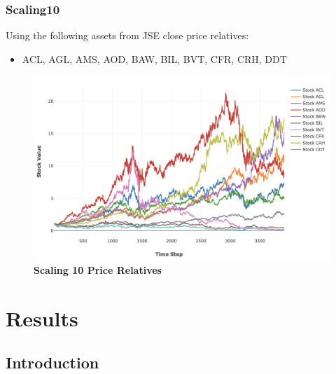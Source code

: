 \documentclass[a4paper,11pt,oneside]{article}
\theoremstyle{plain}
\theoremstyle{definition}
\begin{document}
\subsubsection{Scaling10}\label{dataset_scaling10}

Using the following assets from JSE close price relatives:

\begin{itemize}
	\item ACL, AGL, AMS, AOD, BAW, BIL, BVT, CFR, CRH, DDT
\end{itemize}

\begin{figure}[H]
	\centering
	\includegraphics[scale=0.45]{images/results/prices/scaling10_prices.png} 
	\caption[Scaling 10 Prices]{\textbf{Scaling 10 Price Relatives}}
	\label{figure-scaling0_prices}
\end{figure}










\newpage
\section{Results}\label{Results}
\subsection{Introduction}
\end{document}
